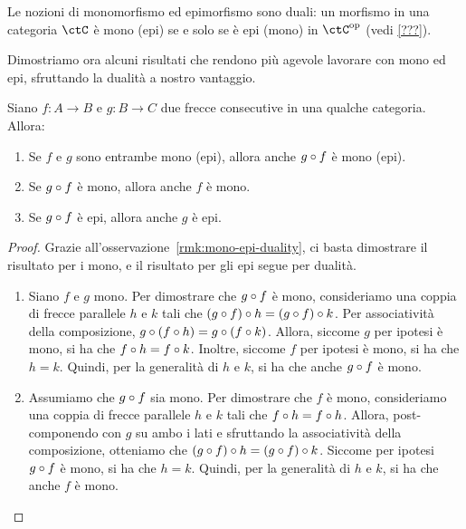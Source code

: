 \begin{remark}
\label{rmk:mono-epi-duality}
Le nozioni di monomorfismo ed epimorfismo sono duali:
un morfismo in una categoria \(\ctC\) è mono (epi) se e solo se è epi (mono) in \(\ctC^{\op}\) (vedi \ref{???}).
\end{remark}

Dimostriamo ora alcuni risultati che rendono più agevole lavorare con mono ed epi,
sfruttando la dualità a nostro vantaggio.

\begin{proposition}
	Siano \(f \colon A \to B\) e \(g \colon B \to C\) due frecce consecutive in una qualche categoria.
	Allora:
	\begin{enumerate}
		\item Se \(f\) e \(g\) sono entrambe mono (epi), allora anche \(g \circ f\) è mono (epi).
		\item Se \(g \circ f\) è mono, allora anche \(f\) è mono.
		\item Se \(g \circ f\) è epi, allora anche \(g\) è epi.
	\end{enumerate}
\end{proposition}
\begin{proof}
	Grazie all'osservazione~\ref{rmk:mono-epi-duality},
	ci basta dimostrare il risultato per i mono,
	e il risultato per gli epi segue per dualità.
	\begin{enumerate}
		\item Siano \(f\) e \(g\) mono.
		Per dimostrare che \(g \circ f\) è mono,
		consideriamo una coppia di frecce parallele \(h\) e \(k\) tali che \((g \circ f) \circ h = (g \circ f) \circ k\).
		Per associatività della composizione, \(g \circ (f \circ h) = g \circ (f \circ k)\).
		Allora, siccome \(g\) per ipotesi è mono, si ha che \(f \circ h = f \circ k\).
		Inoltre, siccome \(f\) per ipotesi è mono, si ha che \(h = k\).
		Quindi, per la generalità di \(h\) e \(k\), si ha che anche \(g \circ f\) è mono.
		\item Assumiamo che \(g \circ f\) sia mono.
		Per dimostrare che \(f\) è mono,
		consideriamo una coppia di frecce parallele \(h\) e \(k\) tali che \(f \circ h = f \circ h\).
		Allora, post-componendo con \(g\) su ambo i lati e sfruttando la associatività della composizione,
		otteniamo che \((g \circ f) \circ h = (g \circ f) \circ k\).
		Siccome per ipotesi \(g \circ f\) è mono, si ha che \(h = k\).
		Quindi, per la generalità di \(h\) e \(k\), si ha che anche \(f\) è mono. \qedhere
	\end{enumerate}
\end{proof}

